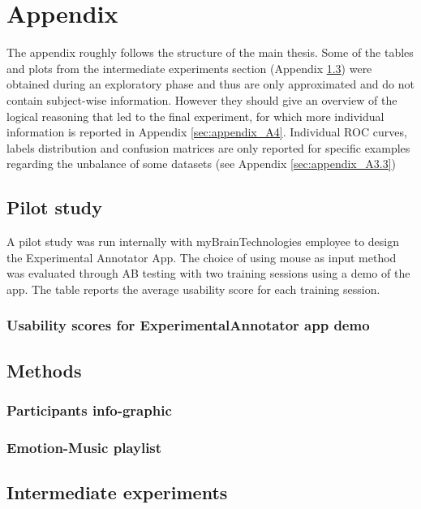 \chapter{Appendix}
\label{app:appendix_A}

The appendix roughly follows the structure of the main thesis. Some of the tables and plots from the intermediate experiments section (Appendix \ref{sec:appendix_A3}) were obtained during an exploratory phase and thus are only approximated and do not contain subject-wise information. However they should give an overview of the logical reasoning that led to the final experiment, for which more individual information is reported in Appendix \ref{sec:appendix_A4}. Individual ROC curves, labels distribution and confusion matrices are only reported for specific examples regarding the unbalance of some datasets (see Appendix \ref{sec:appendix_A3.3})

\section{Pilot study}
\label{sec:appendix_A1}
A pilot study was run internally with myBrainTechnologies employee to design the Experimental Annotator App. The choice of using mouse as input method was evaluated through A\text{\textbar}B testing with two training sessions using a demo of the app. The table reports the average usability score for each training session.

\subsection{Usability scores for ExperimentalAnnotator app demo}
\label{sec:appendix_A1.1}


\section{Methods}
\label{sec:appendix_A2}

\subsection{Participants info-graphic}
\label{sec:appendix_A2.1}

\subsection{Emotion-Music playlist}
\label{sec:appendix_A2.2}


\section{Intermediate experiments}
\label{sec:appendix_A3}

